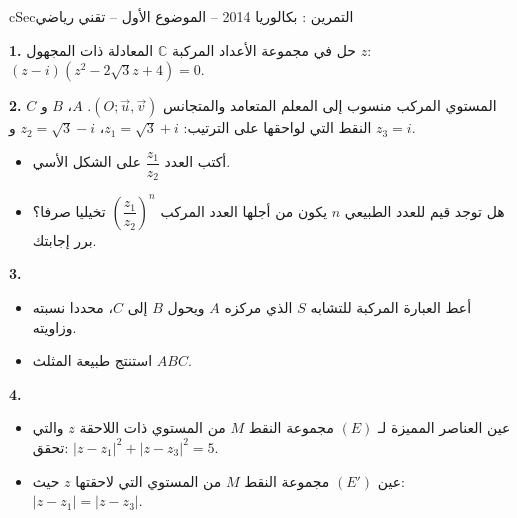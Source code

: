 \documentclass[12pt,a4paper]{article}
\newenvironment{BOX}[2]{\begin{otherlanguage}{english}\begin{arbox}{#1}{#2}}{\end{arbox}\end{otherlanguage}}
\newcounter{exo}
\newenvironment{tamrin}[1]{\stepcounter{exo}\begin{BOX}{cSec}{التمرين \theexo: #1}}{\end{BOX}}
\newenvironment{sq}{\begin{itemize}[leftmargin=2.4em,itemsep=3pt]}{\end{itemize}}
\newcommand{\qa}{\item[(أ)]}\newcommand{\qb}{\item[(ب)]}\newcommand{\qc}{\item[(جـ)]}\newcommand{\qd}{\item[(د)]}\newcommand{\qe}{\item[(هـ)]}
\newcommand{\QQ}[1]{\par\smallskip\textbf{#1.} }
\begin{document}
\begin{tamrin}{بكالوريا 2014 -- الموضوع الأول -- تقني رياضي}
\QQ{1} حل في مجموعة الأعداد المركبة $\mathbb{C}$ المعادلة ذات المجهول $z$: $(z-i)(z^2-2\sqrt3z+4)=0$.

\QQ{2} المستوي المركب منسوب إلى المعلم المتعامد والمتجانس $(O;\vec u,\vec v)$. $A$، $B$ و $C$ النقط التي لواحقها على الترتيب: $z_1=\sqrt3+i$، $z_2=\sqrt3-i$ و $z_3=i$.
\begin{sq}
\qa أكتب العدد $\dfrac{z_1}{z_2}$ على الشكل الأسي.
\qb هل توجد قيم للعدد الطبيعي $n$ يكون من أجلها العدد المركب $\left(\dfrac{z_1}{z_2}\right)^n$ تخيليا صرفا؟ برر إجابتك.
\end{sq}
\QQ{3}
\begin{sq}
\qa أعط العبارة المركبة للتشابه $S$ الذي مركزه $A$ ويحول $B$ إلى $C$، محددا نسبته وزاويته.
\qb استنتج طبيعة المثلث $ABC$.
\end{sq}
\QQ{4}
\begin{sq}
\qa عين العناصر المميزة لـ $(E)$ مجموعة النقط $M$ من المستوي ذات اللاحقة $z$ والتي تحقق: $|z-z_1|^2+|z-z_3|^2=5$.
\qb عين $(E')$ مجموعة النقط $M$ من المستوي التي لاحقتها $z$ حيث: $|z-z_1|=|z-z_3|$.
\end{sq}
\end{tamrin}
\end{document}
